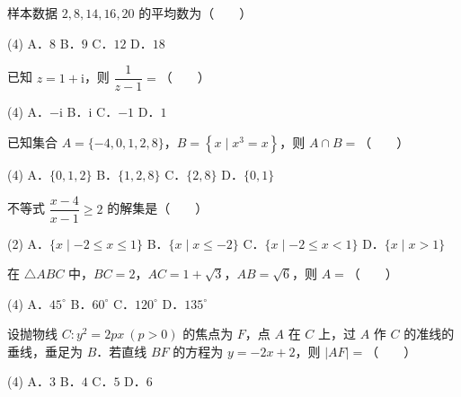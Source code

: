 \begin{question}
样本数据 $2,8,14,16,20$ 的平均数为\mbox{（　　）}

\begin{gkopts}(4)
\task A．$8$
\task B．$9$
\task C．$12$
\task D．$18$
\end{gkopts}

\end{question}
\begin{question}
已知 $z=1+\mathrm{i}$，则 $\dfrac{1}{z-1}=$\mbox{（　　）}

\begin{gkopts}(4)
\task A．$-\mathrm{i}$
\task B．$\mathrm{i}$
\task C．$-1$
\task D．$1$
\end{gkopts}

\end{question}
\begin{question}
已知集合 $A=\{-4,0,1,2,8\}$，$B=\left\{x\mid x^3=x\right\}$，则 $A\cap B=$\mbox{（　　）}

\begin{gkopts}(4)
\task A．$\{0,1,2\}$
\task B．$\{1,2,8\}$
\task C．$\{2,8\}$
\task D．$\{0,1\}$
\end{gkopts}

\end{question}
\begin{question}
不等式 $\dfrac{x-4}{x-1}\ge 2$ 的解集是\mbox{（　　）}

\begin{gkopts}(2)
\task A．$\{x\mid -2\le x\le 1\}$
\task B．$\{x\mid x\le -2\}$
\task C．$\{x\mid -2\le x<1\}$
\task D．$\{x\mid x>1\}$
\end{gkopts}

\end{question}
\begin{question}
在 $\triangle ABC$ 中，$BC=2$，$AC=1+\sqrt3$，$AB=\sqrt6$，则 $A=$\mbox{（　　）}

\begin{gkopts}(4)
\task A．$45^\circ$
\task B．$60^\circ$
\task C．$120^\circ$
\task D．$135^\circ$
\end{gkopts}

\end{question}
\begin{question}
设抛物线 $C:y^2=2px\ (p>0)$ 的焦点为 $F$，点 $A$ 在 $C$ 上，过 $A$ 作 $C$ 的准线的垂线，垂足为 $B$．若直线 $BF$ 的方程为 $y=-2x+2$，则 $|AF|=$\mbox{（　　）}

\begin{gkopts}(4)
\task A．$3$
\task B．$4$
\task C．$5$
\task D．$6$
\end{gkopts}

\end{question}
